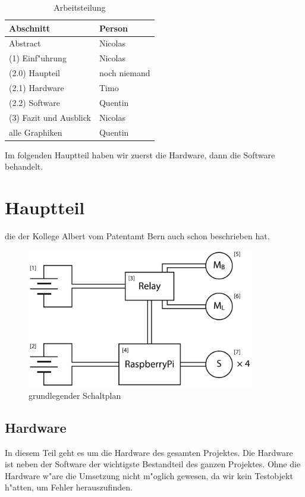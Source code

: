 \documentclass[a4paper,12pt]{article}
\begin{document}
\begin{table}[h]
	\centering
	\begin{tabular}{|l|l|}
	\hline
		Abschnitt & Person \\ \hline
		Abstract & Nicolas \\
		(1) Einf"uhrung & Nicolas \\
		(2.0) Haupteil & noch niemand \\
		(2.1) Hardware & Timo \\
		(2.2) Software & Quentin \\
		(3) Fazit und Ausblick & Nicolas \\
		alle Graphiken & Quentin \\
	\hline
	\end{tabular}
	\caption{Arbeitsteilung}
	\label{Tab1}
\end{table}

Im folgenden Hauptteil haben wir zuerst die Hardware, dann die Software behandelt.

\section{Hauptteil}\label{sec2}

die der Kollege Albert vom Patentamt Bern \cite{ModMyPi} auch schon beschrieben hat.

\begin{figure}[h]
	\centering
	\includegraphics[width=10cm]{./media/circuit_general.png}
	\caption{grundlegender Schaltplan}
	\label{Fig2}
\end{figure}

\subsection{Hardware}\label{sec2.1}

In diesem Teil geht es um die Hardware des gesamten Projektes.
Die Hardware ist neben der Software der wichtigste Bestandteil des ganzen Projektes.
Ohne die Hardware w"are die Umsetzung nicht m"oglich gewesen, da wir kein Testobjekt h"atten, um Fehler herauszufinden.
\end{document}
